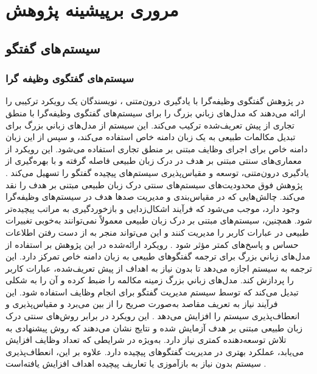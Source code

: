 \section{مروری برپیشینه پژوهش}
\label{BackgroundResearch:my}
\subsection{سیستم های گفتگو}

\subsubsection{سیستم های گفتگوی وظیفه گرا}
در پژوهش گفتگوی وظیفه‌گرا با یادگیری درون‌متنی%
\cite{bocklisch2024task}
، نویسندگان یک رویکرد ترکیبی را ارائه می‌دهند که مدل‌های زباني بزرگ را برای سیستم‌های گفتگوی وظیفه‌گرا با 
منطق تجاری%
 از پیش‌ تعریف‌شده ترکیب می‌کند. این سیستم از مدل‌های زباني بزرگ برای تبدیل مکالمات طبیعی به یک  
زبان دامنه خاص%
 استفاده می‌کند، و سپس از این زبان دامنه خاص برای اجرای وظایف مبتنی بر منطق تجاری استفاده می‌شود. این رویکرد از معماری‌های سنتی مبتنی بر هدف در درک زبان طبیعی فاصله گرفته و با بهره‌گیری از یادگیری درون‌متنی، توسعه و مقیاس‌پذیری سیستم‌های پیچیده گفتگو را تسهیل می‌کند .
\newline
پژوهش فوق محدودیت‌های سیستم‌های سنتی درک زبان طبیعی مبتنی بر هدف را نقد می‌کند. چالش‌هایی که در مقیاس‌بندی و مدیریت صدها هدف در سیستم‌های وظیفه‌گرا وجود دارد، موجب می‌شود که فرآیند اشکال‌زدایی و بازخوردگیری به مراتب پیچیده‌تر شود. همچنین، سیستم‌های مبتنی بر درک زبان طبیعی معمولاً نمی‌توانند به‌خوبی تغییرات طبیعی در عبارات کاربر را مدیریت کنند و این می‌تواند منجر به از دست رفتن اطلاعات حساس و پاسخ‌های کمتر مؤثر شود .
\newline
رویکرد ارائه‌شده در این پژوهش بر استفاده از مدل‌های زباني بزرگ برای ترجمه گفتگوهای طبیعی به زبان دامنه خاص تمرکز دارد. این ترجمه به سیستم اجازه می‌دهد تا بدون نیاز به اهداف از پیش‌ تعریف‌شده، عبارات کاربر را پردازش کند. مدل‌های زباني بزرگ زمینه مکالمه را ضبط کرده و آن را به شکلی تبدیل می‌کند که توسط سیستم مدیریت گفتگو برای انجام وظایف استفاده شود. این فرآیند نیاز به تعریف مقاصد به‌صورت صریح را از بین می‌برد و مقیاس‌پذیری و انعطاف‌پذیری سیستم را افزایش می‌دهد .
\newline
این رویکرد در برابر روش‌های سنتی درک زبان طبیعی مبتنی بر هدف آزمایش شده و نتایج نشان می‌دهند که روش پیشنهادی به تلاش توسعه‌دهنده کمتری نیاز دارد. به‌ویژه در شرایطی که تعداد وظایف افزایش می‌یابد، عملکرد بهتری در مدیریت گفتگوهای پیچیده دارد. علاوه بر این، انعطاف‌پذیری سیستم بدون نیاز به بازآموزی یا تعاریف پیچیده اهداف افزایش یافته‌است .

